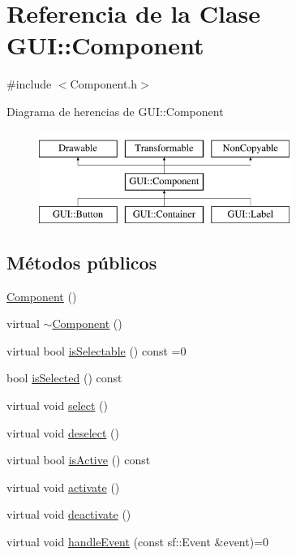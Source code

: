 \hypertarget{classGUI_1_1Component}{}\section{Referencia de la Clase G\+U\+I\+:\+:Component}
\label{classGUI_1_1Component}


{\ttfamily \#include $<$Component.\+h$>$}

Diagrama de herencias de G\+U\+I\+:\+:Component\begin{figure}[H]
\begin{center}
\leavevmode
\includegraphics[height=3.000000cm]{classGUI_1_1Component}
\end{center}
\end{figure}
\subsection*{Métodos públicos}
\begin{DoxyCompactItemize}
\item 
\hyperlink{classGUI_1_1Component_a6a06664380a3d66ee8bcf3a41d760955}{Component} ()
\item 
virtual \hyperlink{classGUI_1_1Component_acb791835e060ed9743bc06bc6c7a7718}{$\sim$\+Component} ()
\item 
virtual bool \hyperlink{classGUI_1_1Component_a44d14506c9a1dbc839e05a6bf99c341b}{is\+Selectable} () const =0
\item 
bool \hyperlink{classGUI_1_1Component_affb93ae274f3dd3f44da70520d13b07d}{is\+Selected} () const 
\item 
virtual void \hyperlink{classGUI_1_1Component_ad0f7d6cc692edf2b0e426bfbd584be45}{select} ()
\item 
virtual void \hyperlink{classGUI_1_1Component_aa37424b238293bb308d357cf3b35c81f}{deselect} ()
\item 
virtual bool \hyperlink{classGUI_1_1Component_a74345f04fbeca17693f59d90bc0ae45b}{is\+Active} () const 
\item 
virtual void \hyperlink{classGUI_1_1Component_a965823e0e62612a7e532eb8c0b98861d}{activate} ()
\item 
virtual void \hyperlink{classGUI_1_1Component_a8964087afef859c015fb8188e619aa81}{deactivate} ()
\item 
virtual void \hyperlink{classGUI_1_1Component_aacf5e981e7b5726f5c7e9436455660ba}{handle\+Event} (const sf\+::\+Event \&event)=0
\end{DoxyCompactItemize}


